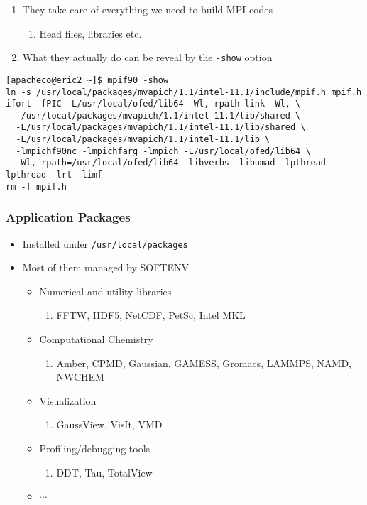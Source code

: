 \documentclass[slidestop,mathserif,compress,xcolor=svgnames,table]{beamer}
\newcommand*\vardiamond{\textcolor{tigerspurple}{%
  \ensuremath{\blacklozenge}}}
\begin{document}
\begin{frame}
\begin{itemize}
\begin{enumerate}
\begin{enumerate}
\end{enumerate}
\item[$\vardiamond$]  They take care of everything we need to build MPI codes
\begin{enumerate}
\item[$\bigstar$]  Head files, libraries etc.
\end{enumerate}
\item[$\vardiamond$]  What they actually do can be reveal by the \texttt{-show} option
\end{enumerate}
\end{itemize}
{\tiny
\begin{alertblock}{}
{%
\begin{verbatim}
[apacheco@eric2 ~]$ mpif90 -show
ln -s /usr/local/packages/mvapich/1.1/intel-11.1/include/mpif.h mpif.h
ifort -fPIC -L/usr/local/ofed/lib64 -Wl,-rpath-link -Wl, \
   /usr/local/packages/mvapich/1.1/intel-11.1/lib/shared \
  -L/usr/local/packages/mvapich/1.1/intel-11.1/lib/shared \
  -L/usr/local/packages/mvapich/1.1/intel-11.1/lib \
  -lmpichf90nc -lmpichfarg -lmpich -L/usr/local/ofed/lib64 \
  -Wl,-rpath=/usr/local/ofed/lib64 -libverbs -libumad -lpthread -lpthread -lrt -limf
rm -f mpif.h
\end{verbatim}
}
\end{alertblock}
}
\end{frame}

\begin{frame}
\frametitle{\small Application Packages}
\begin{itemize}
\item Installed under \texttt{/usr/local/packages}
\item Most of them managed by SOFTENV
\begin{itemize}
\item[$\vardiamond$] Numerical and utility libraries
\begin{enumerate}
\item[$\blacksquare$] FFTW, HDF5, NetCDF, PetSc, Intel MKL
\end{enumerate}
\item[$\vardiamond$] Computational Chemistry
\begin{enumerate}
\item[$\blacksquare$] Amber, CPMD, Gaussian, GAMESS, Gromacs, LAMMPS, NAMD, NWCHEM
\end{enumerate}
\item[$\vardiamond$] Visualization
\begin{enumerate}
\item[$\blacksquare$] GaussView, VisIt, VMD 
\end{enumerate}
\item[$\vardiamond$] Profiling/debugging tools
\begin{enumerate}
\item[$\blacksquare$] DDT, Tau, TotalView
\end{enumerate}
\item[$\vardiamond$] $\cdots$
\end{itemize}
\end{itemize}
\end{frame}
\end{document}

